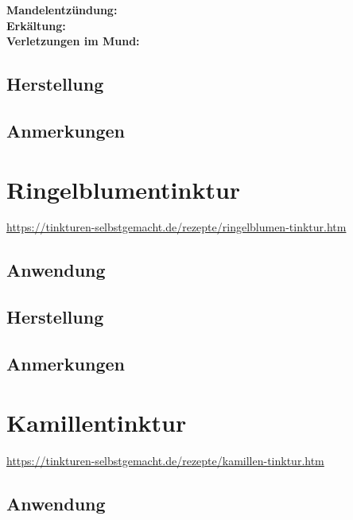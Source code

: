 \textbf{Mandelentzündung:} \\

\textbf{Erkältung:} \\ 

\textbf{Verletzungen im Mund:} \\


\subsection{Herstellung}

\subsection{Anmerkungen}







\section{Ringelblumentinktur}

\cite{tinkturen}

\url{https://tinkturen-selbstgemacht.de/rezepte/ringelblumen-tinktur.htm}


\subsection{Anwendung} 

\subsection{Herstellung}

\subsection{Anmerkungen}






\section{Kamillentinktur}

\cite{tinkturen}

\url{https://tinkturen-selbstgemacht.de/rezepte/kamillen-tinktur.htm}

\subsection{Anwendung}

